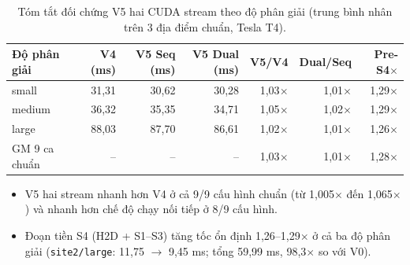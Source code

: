 \begin{table}
\centering
\caption{Tóm tắt đối chứng V5 hai CUDA stream theo độ phân giải (trung bình nhân trên 3 địa điểm chuẩn, Tesla T4).}
\scriptsize
\begin{tabular}{lrrrrrr}
\toprule
Độ phân giải & V4 (ms) & V5 Seq (ms) & V5 Dual (ms) & V5/V4 & Dual/Seq & Pre-S4$\times$ \\
\midrule
small & 31,31 & 30,62 & 30,28 & 1,03$\times$ & 1,01$\times$ & 1,29$\times$ \\
medium & 36,32 & 35,35 & 34,71 & 1,05$\times$ & 1,02$\times$ & 1,29$\times$ \\
large & 88,03 & 87,70 & 86,61 & 1,02$\times$ & 1,01$\times$ & 1,26$\times$ \\
\midrule
GM 9 ca chuẩn & -- & -- & -- & 1,03$\times$ & 1,01$\times$ & 1,28$\times$ \\
\bottomrule
\end{tabular}
\end{table}
\smallskip
\begin{itemize}
\item V5 hai stream nhanh hơn V4 ở cả 9/9 cấu hình chuẩn (từ 1,005$\times$ đến 1,065$\times$) và nhanh hơn chế độ chạy nối tiếp ở 8/9 cấu hình.
\item Đoạn tiền S4 (H2D + S1--S3) tăng tốc ổn định 1,26--1,29$\times$ ở cả ba độ phân giải (\texttt{site2/large}: 11,75 $\rightarrow$ 9,45 ms; tổng 59,99 ms, 98,3$\times$ so với V0).
\end{itemize}
